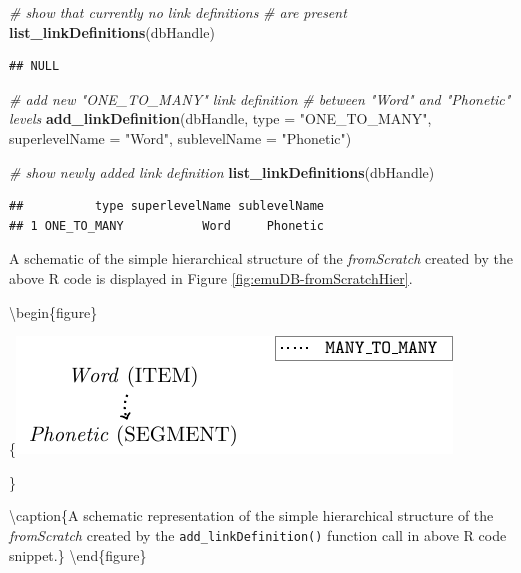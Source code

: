 \documentclass[]{book}
\newenvironment{Shaded}{\begin{snugshade}}{\end{snugshade}}
\newcommand{\CommentTok}[1]{\textcolor[rgb]{0.56,0.35,0.01}{\textit{#1}}}
\newcommand{\DataTypeTok}[1]{\textcolor[rgb]{0.13,0.29,0.53}{#1}}
\newcommand{\KeywordTok}[1]{\textcolor[rgb]{0.13,0.29,0.53}{\textbf{#1}}}
\newcommand{\NormalTok}[1]{#1}
\newcommand{\StringTok}[1]{\textcolor[rgb]{0.31,0.60,0.02}{#1}}
\theoremstyle{definition}
\theoremstyle{definition}
\theoremstyle{definition}
\theoremstyle{remark}
\begin{document}
\begin{Shaded}
\begin{Highlighting}[]
\CommentTok{# show that currently no link definitions}
\CommentTok{# are present}
\KeywordTok{list_linkDefinitions}\NormalTok{(dbHandle)}
\end{Highlighting}
\end{Shaded}

\begin{verbatim}
## NULL
\end{verbatim}

\begin{Shaded}
\begin{Highlighting}[]
\CommentTok{# add new "ONE_TO_MANY" link definition}
\CommentTok{# between "Word" and "Phonetic" levels}
\KeywordTok{add_linkDefinition}\NormalTok{(dbHandle,}
                   \DataTypeTok{type =} \StringTok{"ONE_TO_MANY"}\NormalTok{,}
                   \DataTypeTok{superlevelName =} \StringTok{"Word"}\NormalTok{,}
                   \DataTypeTok{sublevelName =} \StringTok{"Phonetic"}\NormalTok{)}

\CommentTok{# show newly added link definition}
\KeywordTok{list_linkDefinitions}\NormalTok{(dbHandle)}
\end{Highlighting}
\end{Shaded}

\begin{verbatim}
##          type superlevelName sublevelName
## 1 ONE_TO_MANY           Word     Phonetic
\end{verbatim}

A schematic of the simple hierarchical structure of the
\emph{fromScratch} created by the above R code is displayed in Figure
\ref{fig:emuDB-fromScratchHier}.

\textbackslash{}begin\{figure\}

\{\centering \includegraphics[width=0.5\linewidth]{pics/fromScratchDBgraph}

\}

\textbackslash{}caption\{A schematic representation of the simple
hierarchical structure of the \emph{fromScratch} created by the
\texttt{add\_linkDefinition()} function call in above R code
snippet.\}\label{fig:emuDB-fromScratchHier} \textbackslash{}end\{figure\}
\end{document}
